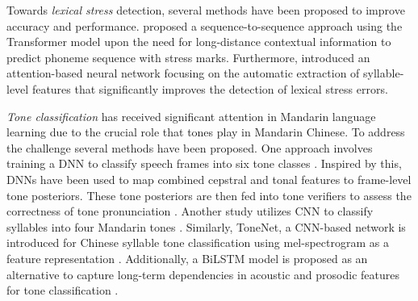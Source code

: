 \documentclass[11pt]{article}
\begin{document}



Towards \textit{lexical stress} detection, several methods have been proposed to improve accuracy and performance. \citet{ruan2019end} proposed a sequence-to-sequence approach using the Transformer model upon the need for long-distance contextual information to predict phoneme sequence with stress marks. Furthermore, \citet{korzekwa2020detection} introduced an attention-based neural network focusing on the automatic extraction of syllable-level features that significantly improves the detection of lexical stress errors.


 





\textit{Tone classification} has received significant attention in Mandarin language learning due to the crucial role that tones play in Mandarin Chinese. To address the challenge several methods have been proposed. One approach involves training a DNN to classify speech frames into six tone classes \cite{ryant2014mandarin}. Inspired by this, DNNs have been used to map combined cepstral and tonal features to frame-level tone posteriors. These tone posteriors are then fed into tone verifiers to assess the correctness of tone pronunciation \cite{lin2018improving, li2018improving}. Another study utilizes CNN to classify syllables into four Mandarin tones \cite{chen2016tone}. Similarly, ToneNet, a CNN-based network is introduced for Chinese syllable tone classification using mel-spectrogram as a feature representation \cite{gao2019tonenet}. Additionally, a BiLSTM model is proposed as an alternative to capture long-term dependencies in acoustic and prosodic features for tone classification \cite{li2019improving}. 
\end{document}
